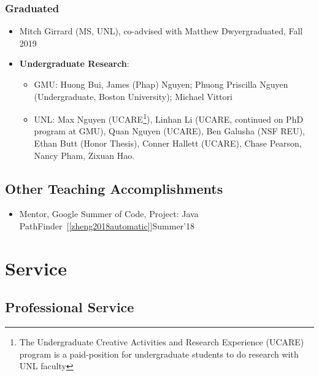 \documentclass[11pt]{article}
\begin{document}
\subsubsection{Graduated}
\begin{itemize}
    \kimhao{}
    \guolong{}
    \alex{}
    \item Mitch Girrard (MS, UNL), co-advised with Matthew Dwyer\hfill graduated, Fall 2019
    
    \item \textbf{Undergraduate Research}:
    \begin{itemize}
        \item GMU: Huong Bui, James (Phap) Nguyen; Phuong Priscilla Nguyen (Undergraduate, Boston University); Michael Vittori
        \item UNL: Max Nguyen (UCARE\footnote{The Undergraduate Creative Activities and Research Experience (UCARE) program is a paid-position for undergraduate students to do research with UNL faculty}), Linhan Li (UCARE, continued on PhD program at GMU), Quan Nguyen (UCARE), Ben Galusha (NSF REU), Ethan Butt (Honor Thesis), Conner Hallett (UCARE), Chase Pearson, Nancy Pham, Zixuan Hao.
    \end{itemize}
\end{itemize}


\subsection{Other Teaching Accomplishments}
\begin{itemize}
    \item Mentor, Google Summer of Code, Project: Java PathFinder~[\ref{zheng2018automatic}]\hfill Summer'18
\end{itemize}

\section{Service}
\subsection{Professional Service}
\end{document}
